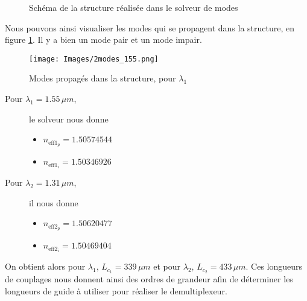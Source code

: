 \documentclass[a4paper,11pt]{report}
\begin{document}
\begin{figure}[H]
\centering
{}
\caption{Schéma de la structure réalisée dans le solveur de modes}

\end{figure}

Nous pouvons ainsi visualiser les modes qui se propagent dans la structure, en figure \ref{mode}. Il y a bien un mode pair et un mode impair.

\begin{figure}[H]
    \centering
    \texttt{[image: Images/2modes\_155.png]}
    \caption{Modes propagés dans la structure, pour $\lambda_1$}
    \label{mode}
\end{figure}




\begin{description}
    \item[Pour $\lambda_1=1.55\,\mu m$,] le solveur nous donne
    \begin{itemize}
        \item $n_{\text{eff}1_p}=1.50574544$
        \item $n_{\text{eff}1_i}=1.50346926$
    \end{itemize}
    \item[Pour $\lambda_2=1.31\,\mu m$,] il nous donne
    \begin{itemize}
        \item $n_{\text{eff}2_p}=1.50620477$
        \item $n_{\text{eff}2_i}=1.50469404$
    \end{itemize}
\end{description}

On obtient alors pour $\lambda_1$, $L_{c_1}=339\,\mu m$ et pour $\lambda_2$, $L_{c_2}=433\,\mu m$. Ces longueurs de couplages nous donnent ainsi des ordres de grandeur afin de déterminer les longueurs de guide à utiliser pour réaliser le demultiplexeur.
\end{document}
